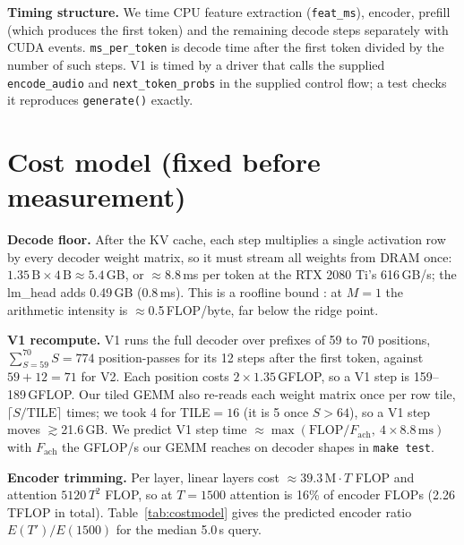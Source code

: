 \documentclass{article}
\begin{document}
\textbf{Timing structure.} We time CPU feature extraction (\texttt{feat\_ms}),
encoder, prefill (which produces the first token) and the remaining decode steps
separately with CUDA events. \texttt{ms\_per\_token} is decode time after the first
token divided by the number of such steps. V1 is timed by a driver that calls the
supplied \texttt{encode\_audio} and \texttt{next\_token\_probs} in the supplied control
flow; a test checks it reproduces \texttt{generate()} exactly.

\section{Cost model (fixed before measurement)}
\label{sec:costmodel}

\textbf{Decode floor.} After the KV cache, each step multiplies a single activation
row by every decoder weight matrix, so it must stream all weights from DRAM once:
$1.35\,\text{B} \times 4\,\text{B} \approx 5.4$\,GB, or $\approx$8.8\,ms per token at
the RTX 2080 Ti's 616\,GB/s; the lm\_head adds 0.49\,GB (0.8\,ms). This is a roofline
bound \citep{williams2009roofline}: at $M=1$ the arithmetic intensity is
$\approx$0.5\,FLOP/byte, far below the ridge point.

\textbf{V1 recompute.} V1 runs the full decoder over prefixes of 59 to 70 positions,
$\sum_{S=59}^{70} S = 774$ position-passes for its 12 steps after the first token,
against $59 + 12 = 71$ for V2. Each position costs $2 \times 1.35$\,GFLOP,
so a V1 step is 159--189\,GFLOP. Our tiled GEMM also re-reads each weight matrix once
per row tile, $\lceil S/\mathrm{TILE} \rceil$ times; we took 4 for TILE${}=16$ (it is 5 once
$S > 64$), so a V1 step moves $\gtrsim$21.6\,GB. We predict V1 step time
$\approx \max(\text{FLOP}/F_{\mathrm{ach}},\ 4 \times 8.8\,\text{ms})$ with $F_{\mathrm{ach}}$
the GFLOP/s our GEMM reaches on decoder shapes in \texttt{make test}.

\textbf{Encoder trimming.} Per layer, linear layers cost $\approx 39.3\,\text{M}\cdot T$
FLOP and attention $5120\,T^2$ FLOP, so at $T=1500$ attention is 16\% of encoder
FLOPs (2.26\,TFLOP in total). Table~\ref{tab:costmodel} gives the predicted encoder
ratio $E(T')/E(1500)$ for the median 5.0\,s query.
\end{document}
